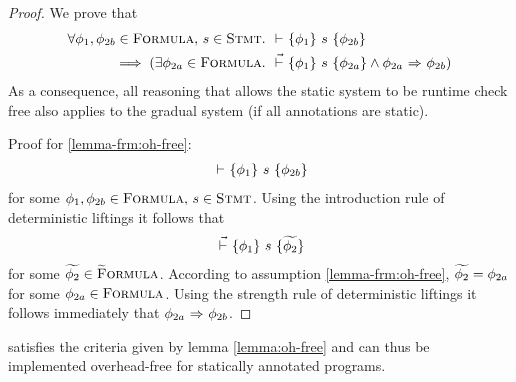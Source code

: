\begin{proof}
    We prove that 
    \begin{align}
    \begin{split}
    \label{frm:oh-free1}
    \forall \phi_1, \phi_{2b} \in \textup{\textsc{Formula}},\, s \in \textup{\textsc{Stmt}}.~
    &{} \,\,{\vdash}\,\, \{{\phi_1}\} ~{s}~ \{{\phi_{2b}}\} \\
    \implies 
    (\exists \phi_{2a} \in \textup{\textsc{Formula}}.~ &{} \,\,\vec{\vdash}\,\, \{{\phi_1}\} ~{s}~ \{{\phi_{2a}}\} \wedge {\phi_{2a}} \,\,{\Rightarrow}\,\, {\phi_{2b}})
    \end{split}
    \end{align}
    As a consequence, all reasoning that allows the static system to be runtime check free also applies to the gradual system (if all annotations are static).
    
    Proof for \ref{lemma-frm:oh-free}:
    \begin{align*}
    {} \,\,{\vdash}\,\, \{{\phi_1}\} ~{s}~ \{{\phi_{2b}}\}
    \end{align*}
    for some $\phi_1, \phi_{2b} \in \textup{\textsc{Formula}},\, s \in \textup{\textsc{Stmt}}$.
    Using the introduction rule of deterministic liftings it follows that
    \begin{align*}
    {} \,\,\vec{\vdash}\,\, \{{\phi_1}\} ~{s}~ \{{\widetilde{\phi_2}}\}
    \end{align*}
    for some $\widetilde{\phi_2} \in \textup{\textsc{\ensuremath{\widetilde{\text{F}}}ormula}}$.
    According to assumption \ref{lemma-frm:oh-free}, $\widetilde{\phi_2} = \phi_{2a}$ for some $\phi_{2a} \in \textup{\textsc{Formula}}$.
    Using the strength rule of deterministic liftings it follows immediately that ${\phi_{2a}} \,\,{\Rightarrow}\,\, {\phi_{2b}}$.

\begin{comment}
    Proof for claim that optimality of $\dgthoare{}{\cdot}{\cdot}{\cdot}$ implies \ref{lemma-frm:oh-free} if \tset{GDPreservation} holds.
    Let $\Phi \defeq \{~ \phi_2 ~|~ \thoare{}{\phi_1}{s}{\phi_2} ~\}$ for some  $\phi_1 \in \setFormula,\, s \in \setStmt$.
    $\Phi$ is the set of all deducible postconditions for given precondition and statement.
    If $\Phi$ is not empty, then the introduction rule of deterministic liftings implies that
    $\dgthoare{}{\phi_1}{s}{\grad{\phi_2}}$ for some $\grad{\phi_2} \in \setGFormula$.
    \begin{description}
        \item[Case 1: $\exists \pi_1, \pi_2.~ \sstepConsume{s}{\pi_1}{\pi_2} \wedge \evalphiGen{\pi_1}{\phi_1}$]~\\
        Due to soundness of the static system, it follows that
        \begin{displaymath}
        \forall \phi_2 \in \Phi.~ \evalphiGen{\pi_2}{\phi_2}
        \end{displaymath}
    \end{description}
    \end{comment}
\end{proof}

\gvlidf satisfies the criteria given by lemma \ref{lemma:oh-free} and can thus be implemented overhead-free for statically annotated programs.
